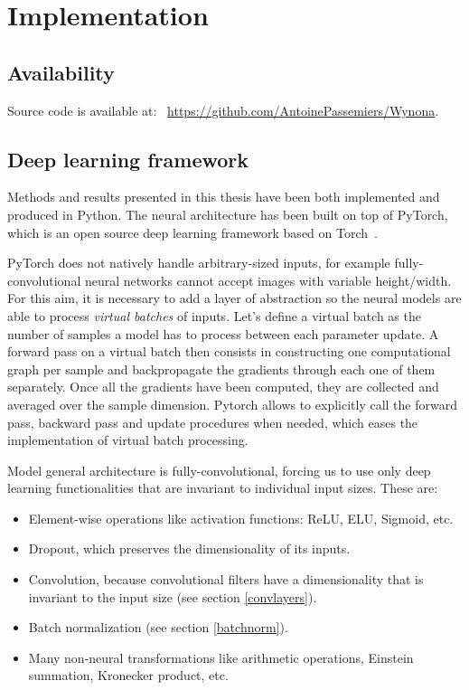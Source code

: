 \section{Implementation}

  \subsection{Availability}

    Source code is available at: \,
    \href{https://github.com/AntoinePassemiers/Wynona}{https://github.com/AntoinePassemiers/Wynona}.

  \subsection{Deep learning framework}

    Methods and results presented in this thesis have been both implemented and produced in
    Python. The neural architecture has been built on top of PyTorch,
    which is an open source deep learning framework based on Torch~\cite{torch}.

    PyTorch does not natively handle arbitrary-sized inputs, for example fully-convolutional
    neural networks cannot accept images with variable height/width.
    For this aim, it is necessary to add a layer of abstraction so the neural models are
    able to process \textit{virtual batches} of inputs. Let's define a virtual batch as the number
    of samples a model has to process between each parameter update.
    A forward pass on a virtual batch then consists in constructing one computational graph
    per sample and backpropagate the gradients through each one of them separately.
    Once all the gradients have been computed, they are collected and averaged over the sample
    dimension. Pytorch allows to explicitly call the forward pass, backward pass and update
    procedures when needed, which eases the implementation of virtual batch processing.

    Model general architecture is fully-convolutional, forcing us to use only deep learning
    functionalities that are invariant to individual input sizes. These are:

    \begin{itemize}
      \item Element-wise operations like activation functions: ReLU, ELU, Sigmoid, etc.
      \item Dropout, which preserves the dimensionality of its inputs.
      \item Convolution, because convolutional filters have a dimensionality that is
      invariant to the input size (see section \ref{convlayers}).
      \item Batch normalization (see section \ref{batchnorm}).
      \item Many non-neural transformations like arithmetic operations, Einstein
      summation, Kronecker product, etc.
    \end{itemize}

